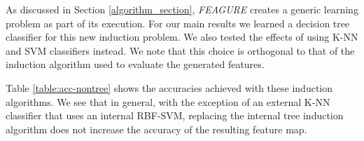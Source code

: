 \documentclass[twoside,11pt]{article}
\theoremstyle{definition}
\begin{document}

As discussed in Section \ref{algorithm_section}, \emph{FEAGURE} creates a generic learning problem as part of its execution. For our main results we learned a decision tree classifier for this new induction problem.
We also tested the effects of using K-NN and SVM classifiers instead. %
We note that this choice is orthogonal to that of the induction algorithm used to evaluate the generated features.

Table \ref{table:acc-nontree} shows the accuracies achieved with these induction algorithms. We see that in general, with the exception of an external K-NN classifier that uses an internal RBF-SVM, replacing the internal tree induction algorithm does not increase the accuracy of the resulting feature map.
\end{document}
